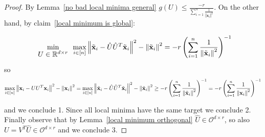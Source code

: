 \documentclass{article}
\newcommand{\claimref}[1]{claim~\ref{#1}}
\newcommand{\Lemmaref}[1]{Lemma~\ref{#1}}
\newcommand{\x}{{\mathbf x}}
\newcommand{\cO}{\mathcal{O}}
\newcommand{\orth}[2]{\cO^{#1\times #2}}
\begin{document}
\begin{proof}
By \Lemmaref{no bad local minima general} $g(U)\le\frac{-r}{\sum_{i=1}^n \frac{1}{\left\Vert \x_{i}\right\Vert^{2}}}$. On the other hand, by \claimref{local minimum is global}:

$$
\min_{\begin{array}{c}
U\in\mathbb{R}^{d\times r}
\end{array}}\max_{i\in[n]}\left\Vert \Tilde{\x}_i-\hat{U}\hat{U}^T\Tilde{\x}_i\right\Vert^2-\left\Vert\Tilde{\x}_i\right\Vert^2=-r\left({\sum_{i=1}^n \frac{1}{\left\Vert \Tilde{\x}_{i}\right\Vert^{2}}}\right)^{-1}
$$
so
$$
\max_{i\in[n]}\left\Vert \x_i-U{U}^T{\x}_i\right\Vert^2-\left\Vert{\x}_i\right\Vert^2=\max_{i\in[n]}\left\Vert \Tilde{\x}_i-\hat{U}\hat{U}^T\Tilde{\x}_i\right\Vert^2-\left\Vert\Tilde{\x}_i\right\Vert^2\ge-r\left({\sum_{i=1}^n\frac{1}{\left\Vert\Tilde{\x}_{i}\right\Vert^{2}}}\right)^{-1}=-r\left({\sum_{i=1}^n \frac{1}{\left\Vert{\x}_{i}\right\Vert^{2}}}\right)^{-1}
$$

and we conclude 1. Since all local minima have the same target we conclude 2. Finally observe that by \Lemmaref{local minimum orthogonal} $\hat{U}\in\orth{d}{r}$, so also $U=V^T\hat{U}\in\orth{d}{r}$ and we conclude 3.

\end{proof}
\end{document}
